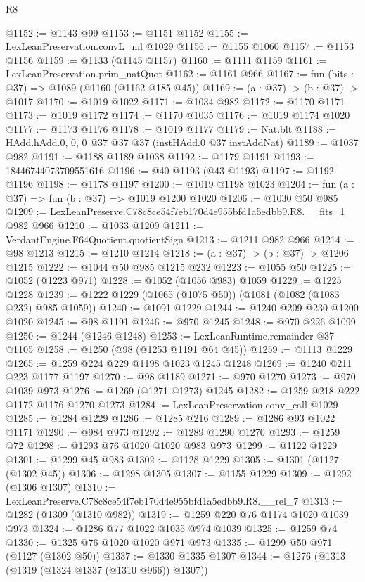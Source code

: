 \begin{lexlean}{R8}
\begin{coremodule}
@1152 := @1143 @99
@1153 := @1151 @1152
@1155 := LexLeanPreservation.convL_nil @1029
@1156 := @1155 @1060
@1157 := @1153 @1156
@1159 := @1133 (@1145 @1157)
@1160 := @1111 @1159
@1161 := LexLeanPreservation.prim_natQuot
@1162 := @1161 @966
@1167 := fun (bits : @37) => @1089 (@1160 (@1162 @185 @45))
@1169 := (a : @37) -> (b : @37) -> @1017
@1170 := @1019 @1022
@1171 := @1034 @982
@1172 := @1170 @1171
@1173 := @1019 @1172
@1174 := @1170 @1035
@1176 := @1019 @1174 @1020
@1177 := @1173 @1176
@1178 := @1019 @1177
@1179 := Nat.blt
@1188 := HAdd.hAdd.{0, 0, 0} @37 @37 @37 (instHAdd.{0} @37 instAddNat)
@1189 := @1037 @982
@1191 := @1188 @1189 @1038
@1192 := @1179 @1191
@1193 := 18446744073709551616
@1196 := @40 @1193 (@43 @1193)
@1197 := @1192 @1196
@1198 := @1178 @1197
@1200 := @1019 @1198 @1023
@1204 := fun (a : @37) => fun (b : @37) => @1019 @1200 @1020
@1206 := @1030 @50 @985
@1209 := LexLeanPreserve.C78c8ce54f7eb170d4e955bfd1a5edbb9.R8.__fits_1 @982 @966
@1210 := @1033 @1209
@1211 := VerdantEngine.F64Quotient.quotientSign
@1213 := @1211 @982 @966
@1214 := @98 @1213
@1215 := @1210 @1214
@1218 := (a : @37) -> (b : @37) -> @1206 @1215
@1222 := @1044 @50 @985 @1215 @232
@1223 := @1055 @50
@1225 := @1052 (@1223 @971)
@1228 := @1052 (@1056 @983) @1059
@1229 := @1225 @1228
@1239 := @1222 @1229 (@1065 (@1075 @50)) (@1081 (@1082 (@1083 @232) @985 @1059))
@1240 := @1091 @1229
@1244 := @1240 @209 @230 @1200 @1020
@1245 := @98 @1191
@1246 := @970 @1245
@1248 := @970 @226 @1099
@1250 := @1244 (@1246 @1248)
@1253 := LexLeanRuntime.remainder @37 @1105
@1258 := @1250 (@98 (@1253 @1191 @64 @45))
@1259 := @1113 @1229
@1265 := @1259 @224 @229 @1198 @1023 @1245 @1248
@1269 := @1240 @211 @223 @1177 @1197
@1270 := @98 @1189
@1271 := @970 @1270
@1273 := @970 @1039 @973
@1276 := @1269 (@1271 @1273) @1245
@1282 := @1259 @218 @222 @1172 @1176 @1270 @1273
@1284 := LexLeanPreservation.conv_call @1029
@1285 := @1284 @1229
@1286 := @1285 @216
@1289 := @1286 @93 @1022 @1171
@1290 := @984 @973
@1292 := @1289 @1290 @1270
@1293 := @1259 @72
@1298 := @1293 @76 @1020 @1020 @983 @973
@1299 := @1122 @1229
@1301 := @1299 @45 @983
@1302 := @1128 @1229
@1305 := @1301 (@1127 (@1302 @45))
@1306 := @1298 @1305
@1307 := @1155 @1229
@1309 := @1292 (@1306 @1307)
@1310 := LexLeanPreserve.C78c8ce54f7eb170d4e955bfd1a5edbb9.R8.__rel_7
@1313 := @1282 (@1309 (@1310 @982))
@1319 := @1259 @220 @76 @1174 @1020 @1039 @973
@1324 := @1286 @77 @1022 @1035 @974 @1039
@1325 := @1259 @74
@1330 := @1325 @76 @1020 @1020 @971 @973
@1335 := @1299 @50 @971 (@1127 (@1302 @50))
@1337 := @1330 @1335 @1307
@1344 := @1276 (@1313 (@1319 (@1324 @1337 (@1310 @966)) @1307))

\end{coremodule}
\end{lexlean}
